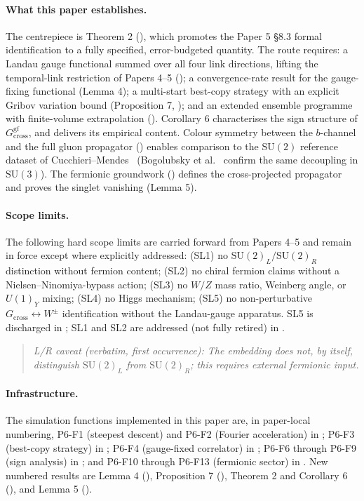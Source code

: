 \documentclass[11pt,a4paper]{article}
\theoremstyle{plain}
\theoremstyle{definition}
\theoremstyle{remark}
\newcommand{\SU}{\mathrm{SU}}
\newcommand{\Gcross}{G_{\mathrm{cross}}}
\newcommand{\Gcrossgf}{G_{\mathrm{cross}}^{\mathrm{gf}}}
\begin{document}
\paragraph{What this paper establishes.}
The centrepiece is Theorem 2 (), which promotes the
Paper 5 \S8.3 formal identification to a fully specified, error-budgeted
quantity. The route requires: a Landau gauge functional summed over all
four link directions, lifting the temporal-link restriction of Papers
4--5 (); a convergence-rate result for the
gauge-fixing functional (Lemma 4); a multi-start best-copy strategy
with an explicit Gribov variation bound (Proposition 7,
); and an extended ensemble programme with
finite-volume extrapolation (). Corollary 6
characterises the sign structure of $\Gcrossgf$, and
 delivers its empirical content. Colour
symmetry between the $b$-channel and the full gluon propagator
() enables comparison to the $\SU(2)$ reference
dataset of Cucchieri--Mendes~\cite{CM} (Bogolubsky et al.~\cite{Bo} confirm
the same decoupling in $\SU(3)$). The
fermionic groundwork () defines the cross-projected
propagator and proves the singlet vanishing (Lemma 5).

\paragraph{Scope limits.}
The following hard scope limits are carried forward from Papers 4--5
and remain in force except where explicitly addressed: (SL1) no
$\SU(2)_L/\SU(2)_R$ distinction without fermion content; (SL2) no
chiral fermion claims without a Nielsen--Ninomiya-bypass action; (SL3)
no $W/Z$ mass ratio, Weinberg angle, or $U(1)_Y$ mixing; (SL4) no Higgs
mechanism; (SL5) no non-perturbative $\Gcross\leftrightarrow W^{\pm}$
identification without the Landau-gauge apparatus. SL5 is discharged in
; SL1 and SL2 are addressed (not fully retired) in
.

\begin{quote}
\itshape
L/R caveat (verbatim, first occurrence): The embedding does not, by
itself, distinguish $\SU(2)_L$ from $\SU(2)_R$; this requires external
fermionic input.
\end{quote}

\paragraph{Infrastructure.}
The simulation functions implemented in this paper are, in paper-local
numbering, P6-F1 (steepest descent) and P6-F2 (Fourier acceleration) in
; P6-F3 (best-copy strategy) in ;
P6-F4 (gauge-fixed correlator) in ; P6-F6 through
P6-F9 (sign analysis) in ; and P6-F10 through
P6-F13 (fermionic sector) in . New numbered results
are Lemma 4 (), Proposition 7 (),
Theorem 2 and Corollary 6 (), and Lemma 5
().
\end{document}
